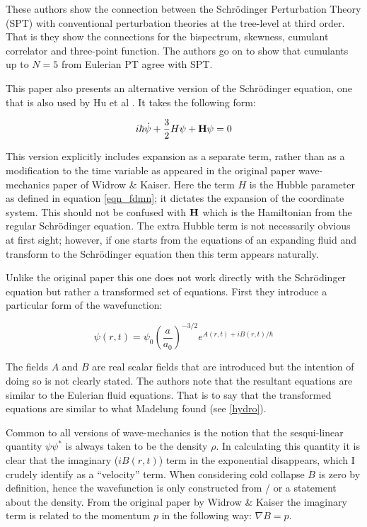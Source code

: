 These authors show the connection between the Schr\"odinger Perturbation Theory (SPT) with conventional perturbation theories at the tree-level at third order. That is they show the connections for the bispectrum, skewness, cumulant correlator and three-point function. The authors go on to show that cumulants up to $N=5$ from Eulerian PT agree with SPT.

This paper also presents an alternative version of the Schr\"odinger equation, one that is also used by Hu et al \citep{bib_whu}. It takes the following form:

\begin{equation}
i\hbar\dot{\psi} + \frac{3}{2}H\psi + {\bf H}\psi = 0
\end{equation}

\noindent This version explicitly includes expansion as a separate term, rather than as a modification to the time variable as appeared in the original paper wave-mechanics paper of Widrow \& Kaiser. Here the term $H$ is the Hubble parameter as defined in equation \ref{eqn_fdmn}; it dictates the expansion of the coordinate system. This should not be confused with ${\bf H}$ which is the Hamiltonian from the regular Schr\"odinger equation. The extra Hubble term is not necessarily obvious at first sight; however, if one starts from the equations of an expanding fluid and transform to the Schr\"odinger equation then this term appears naturally.

Unlike the original paper this one does not work directly with the Schr\"odinger equation but rather a transformed set of equations. First they introduce a particular form of the wavefunction:

\begin{equation}
\psi(r,t) = \psi_0 \left(\frac{a}{a_0}\right)^{-3/2} e^{A(r,t) + i B(r,t)/\hbar}
\end{equation}

\noindent The fields $A$ and $B$ are real scalar fields that are introduced but the intention of doing so is not clearly stated. The authors note that the resultant equations are similar to the Eulerian fluid equations. That is to say that the transformed equations are similar to what Madelung found (see \ref{hydro}).

Common to all versions of wave-mechanics is the notion that the sesqui-linear quantity $\psi\psi^*$ is always taken to be the density $\rho$. In calculating this quantity it is clear that the imaginary ($i B(r,t)$) term in the exponential disappears, which I crudely identify as a ``velocity'' term. When considering cold collapse $B$ is zero by definition, hence the wavefunction is only constructed from / or a statement about the density. From the original paper by Widrow \& Kaiser the imaginary term is related to the momentum $p$ in the following way: $\nabla B = p$.

